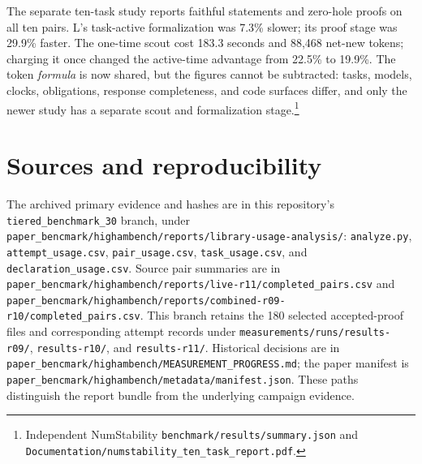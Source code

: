 \documentclass[10pt]{article}
\newcommand{\pathref}[1]{\nolinkurl{#1}}
\begin{document}
The separate ten-task study reports faithful statements and zero-hole proofs on all ten pairs. L's task-active formalization was 7.3\% slower; its proof stage was 29.9\% faster. The one-time scout cost 183.3 seconds and 88,468 net-new tokens; charging it once changed the active-time advantage from 22.5\% to 19.9\%. The token \emph{formula} is now shared, but the figures cannot be subtracted: tasks, models, clocks, obligations, response completeness, and code surfaces differ, and only the newer study has a separate scout and formalization stage.\footnote{Independent NumStability \pathref{benchmark/results/summary.json} and \pathref{Documentation/numstability_ten_task_report.pdf}.}

\section{Sources and reproducibility}
The archived primary evidence and hashes are in this repository's
\texttt{tiered\_benchmark\_30} branch, under
\pathref{paper_bencmark/highambench/reports/library-usage-analysis/}:
\pathref{analyze.py}, \pathref{attempt_usage.csv},
\pathref{pair_usage.csv}, \pathref{task_usage.csv}, and
\pathref{declaration_usage.csv}. Source pair summaries are in
\pathref{paper_bencmark/highambench/reports/live-r11/completed_pairs.csv} and
\pathref{paper_bencmark/highambench/reports/combined-r09-r10/completed_pairs.csv}.
This branch retains the 180 selected
accepted-proof files and corresponding attempt records under
\pathref{measurements/runs/results-r09/}, \pathref{results-r10/}, and
\pathref{results-r11/}. Historical decisions are in
\pathref{paper_bencmark/highambench/MEASUREMENT_PROGRESS.md}; the
paper manifest is \pathref{paper_bencmark/highambench/metadata/manifest.json}.
These paths distinguish the report bundle from the underlying campaign evidence.
\end{document}
